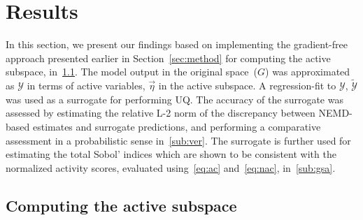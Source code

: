 \section{Results}
\label{sec:results}

In this section, we present our findings based on implementing the gradient-free approach presented
earlier in Section~\ref{sec:method} for computing the active subspace, in~\ref{sub:cas}. 
The model output in the original space~($G$)
was approximated as $\mathcal{Y}$ in terms of active variables, $\vec\eta$ in the active subspace. A regression-fit
to $\mathcal{Y}$, $\tilde{\mathcal{Y}}$ was used as a surrogate for performing UQ. 
The accuracy of the surrogate was assessed by 
estimating the relative L-2 norm of the discrepancy between NEMD-based estimates and surrogate predictions,
and performing a comparative assessment in a probabilistic sense in~\ref{sub:ver}. The surrogate is further
used for estimating the total Sobol' indices which are shown to be consistent with the normalized activity scores,
evaluated using~\eqref{eq:ac} and~\eqref{eq:nac}, in~\ref{sub:gsa}.

\subsection{Computing the active subspace}
\label{sub:cas}

